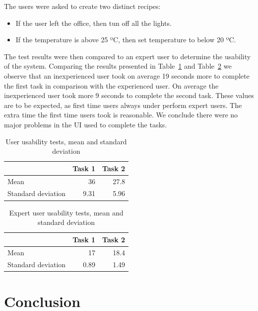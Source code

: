 \documentclass[conference]{IEEEtran}
\begin{document}
The users were asked to create two distinct recipes:

\begin{itemize}
  \item If the user left the office, then tun off all the lights.
  \item If the temperature is above 25 ºC, then set temperature to below 20 ºC. 
\end{itemize} 

The test results were then compared to an expert user to determine the usability of the system. Comparing the results presented in Table~\ref{eval:automation2} and Table~\ref{eval:automation3} we observe that an inexperienced user took on average 19 seconds more to complete the first task in comparison with the experienced user. On average the inexperienced user took more 9 seconds to complete the second task. These values are to be expected, as first time users always under perform expert users. The extra time the first time users took is reasonable. We conclude there were no major problems in the \ac{UI} used to complete the tasks.

\begin{table}[h]
\centering
\begin{tabular}{l|r|r|}
\cline{2-3}
 & \multicolumn{1}{l|}{Task 1} & \multicolumn{1}{l|}{Task 2} \\ \hline
\multicolumn{1}{|l|}{Mean} & 36 & 27.8 \\ \hline
\multicolumn{1}{|l|}{Standard deviation} & 9.31 & 5.96 \\ \hline
\end{tabular}
\caption{User usability tests, mean and standard deviation}
\label{eval:automation2}
\end{table}


\begin{table}[h]
\centering
\begin{tabular}{l|r|r|}
\cline{2-3}
 & \multicolumn{1}{l|}{Task 1} & \multicolumn{1}{l|}{Task 2} \\ \hline
\multicolumn{1}{|l|}{Mean} & 17 & 18.4 \\ \hline
\multicolumn{1}{|l|}{Standard deviation} & 0.89 & 1.49 \\ \hline
\end{tabular}
\caption{Expert user usability tests, mean and standard deviation}
\label{eval:automation3}
\end{table}



\section*{Conclusion}
\end{document}
